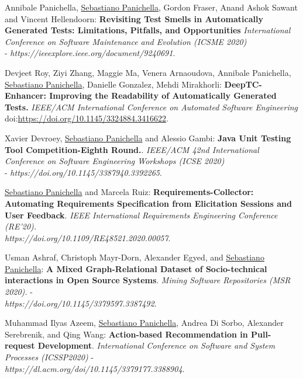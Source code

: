 \documentclass[10pt]{article}
\newcommand\doilink[1]{\href{http://dx.doi.org/#1}{#1}}
\newcommand\doi[1]{doi:\doilink{#1}}
\begin{document}
\begin{bibenum}
      \item \label{Cm17} Annibale Panichella, \underline{Sebastiano Panichella}, Gordon Fraser, Anand Ashok Sawant and Vincent Hellendoorn:  \textbf{Revisiting Test Smells in Automatically Generated Tests: Limitations, Pitfalls, and Opportunities}  \emph{International Conference on Software Maintenance and Evolution (ICSME 2020)} \\- \textit{https://ieeexplore.ieee.org/document/9240691}. 
      \item \label{Cm16} Devjeet Roy, Ziyi Zhang, Maggie Ma, Venera Arnaoudova, Annibale Panichella,  \underline{Sebastiano Panichella}, Danielle Gonzalez, Mehdi Mirakhorli:  \textbf{DeepTC-Enhancer: Improving the Readability of Automatically Generated Tests.}  \emph{IEEE/ACM International Conference on Automated Software Engineering} \\ \doi{https://doi.org/10.1145/3324884.3416622}. 
      \item \label{Cm15} Xavier Devroey, \underline{Sebastiano Panichella} and Alessio Gambi:  \textbf{Java Unit Testing Tool Competition-Eighth Round.}.  \emph{IEEE/ACM 42nd International Conference on Software Engineering Workshops (ICSE 2020)} \\- \textit{https://doi.org/10.1145/3387940.3392265}. 
    \item \label{Cm14} \underline{Sebastiano Panichella} and Marcela Ruiz:  \textbf{Requirements-Collector: Automating Requirements Specification from Elicitation Sessions and User Feedback}.  \emph{IEEE International Requirements Engineering Conference (RE'20).} \\\textit{https://doi.org/10.1109/RE48521.2020.00057}. 
      \item \label{Cm13} Usman Ashraf, Christoph Mayr-Dorn, Alexander Egyed, and \underline{Sebastiano Panichella}:  \textbf{A Mixed Graph-Relational Dataset of Socio-technical interactions in Open Source Systems}.  \emph{Mining Software Repositories (MSR 2020).} - \\\textit{https://doi.org/10.1145/3379597.3387492}. %

      \item \label{Cm12}  Muhammad Ilyas Azeem, \underline{Sebastiano Panichella}, Andrea Di Sorbo, Alexander Serebrenik, and Qing Wang:  \textbf{Action-based Recommendation in Pull-request Development}.  \emph{International Conference on Software and System Processes (ICSSP2020)} - \\\textit{https://dl.acm.org/doi/10.1145/3379177.3388904}. %


\end{bibenum}
\end{document}
